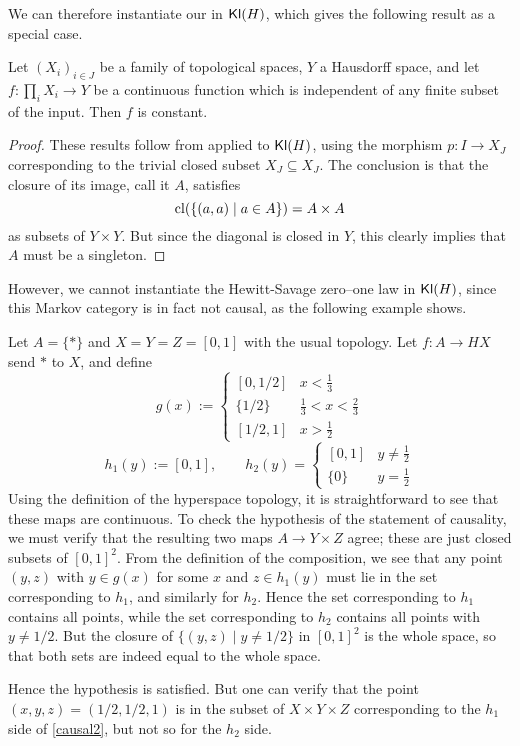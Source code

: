 \documentclass[11pt]{article}
\begin{document}
We can therefore instantiate our  in $\operatorname{\mathsf{Kl}}(H)$, which gives the following result as a special case.

\begin{corollary}
    Let $(X_i)_{i \in J}$ be a family of topological spaces, $Y$ a Hausdorff space, and let $f: \prod_i X_i \to Y$ be a continuous function
    which is independent of any finite subset of the input.
    Then $f$ is constant.
    \label{vietoris_kolmogorov}
\end{corollary}
\begin{proof}
	These results follow from  applied to $\operatorname{\mathsf{Kl}}(H)$,
    using the morphism $p : I \to X_J$ corresponding to the trivial closed subset $X_J \subseteq X_J$.
	The conclusion is that the closure of its image, call it $A$, satisfies
	\[
		\operatorname{cl}(\{(a,a) \mid a \in A\}) = A \times A
	\]
	as subsets of $Y \times Y$.
    But since the diagonal is closed in $Y$, this clearly implies that $A$ must be a singleton.
\end{proof}

However, we cannot instantiate the Hewitt-Savage zero--one law in $\operatorname{\mathsf{Kl}}(H)$, since this Markov category is in fact not causal, as the following example shows.

\begin{example}
	Let $A = \{*\}$ and $X = Y = Z = [0,1]$ with the usual topology.
    Let $f: A \to HX$ send $*$ to $X$, and define
    \[g(x) :=  \begin{cases} [0,1/2] & x < \frac{1}{3}\\ \{1/2\} & \frac{1}{3} < x < \frac{2}{3}\\ [1/2,1] & x > \frac{1}{2}\end{cases}\]
    \[
    	h_1(y) := [0,1], \qquad h_2(y) = \begin{cases}[0,1] & y \neq \frac{1}{2}\\ \{0\} &  y = \frac{1}{2}\end{cases}
    \]
    Using the definition of the hyperspace topology, it is straightforward to see that these maps are continuous. To check the hypothesis of the statement of causality, we must verify that the resulting two maps $A \to Y \times Z$ agree; these are just closed subsets of $[0,1]^2$. From the definition of the composition, we see that any point $(y,z)$ with $y \in g(x)$ for some $x$ and $z \in h_1(y)$ must lie in the set corresponding to $h_1$,
and similarly for $h_2$.
Hence the set corresponding to $h_1$ contains all points, while the set corresponding to $h_2$ contains all points with $y \neq 1/2$.
But the closure of $\{(y,z) \mid y \neq 1/2\}$ in $[0,1]^2$ is the whole space, so that both sets are indeed equal to the whole space.

Hence the hypothesis is satisfied.
But one can verify that the point $(x,y,z) = (1/2,1/2,1)$ is in the subset of $X \times Y \times Z$ corresponding to the $h_1$ side of \eqref{causal2}, but not so for the $h_2$ side.
\end{example}
\end{document}
